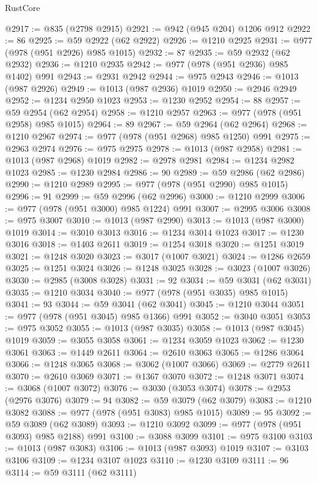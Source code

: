 \begin{lexlean}{RustCore}
\begin{coremodule}
@2917 := @835 (@2798 @2915)
@2921 := @942 (@945 @204) @1206 @912
@2922 := 86
@2925 := @59 @2922 (@62 @2922)
@2926 := @1210 @2925
@2931 := @977 (@978 (@951 @2926) @985 @1015)
@2932 := 87
@2935 := @59 @2932 (@62 @2932)
@2936 := @1210 @2935
@2942 := @977 (@978 (@951 @2936) @985 @1402) @991
@2943 := @2931 @2942
@2944 := @975 @2943
@2946 := @1013 (@987 @2926)
@2949 := @1013 (@987 @2936) @1019
@2950 := @2946 @2949
@2952 := @1234 @2950 @1023
@2953 := @1230 @2952
@2954 := 88
@2957 := @59 @2954 (@62 @2954)
@2958 := @1210 @2957
@2963 := @977 (@978 (@951 @2958) @985 @1015)
@2964 := 89
@2967 := @59 @2964 (@62 @2964)
@2968 := @1210 @2967
@2974 := @977 (@978 (@951 @2968) @985 @1250) @991
@2975 := @2963 @2974
@2976 := @975 @2975
@2978 := @1013 (@987 @2958)
@2981 := @1013 (@987 @2968) @1019
@2982 := @2978 @2981
@2984 := @1234 @2982 @1023
@2985 := @1230 @2984
@2986 := 90
@2989 := @59 @2986 (@62 @2986)
@2990 := @1210 @2989
@2995 := @977 (@978 (@951 @2990) @985 @1015)
@2996 := 91
@2999 := @59 @2996 (@62 @2996)
@3000 := @1210 @2999
@3006 := @977 (@978 (@951 @3000) @985 @1224) @991
@3007 := @2995 @3006
@3008 := @975 @3007
@3010 := @1013 (@987 @2990)
@3013 := @1013 (@987 @3000) @1019
@3014 := @3010 @3013
@3016 := @1234 @3014 @1023
@3017 := @1230 @3016
@3018 := @1403 @2611
@3019 := @1254 @3018
@3020 := @1251 @3019
@3021 := @1248 @3020
@3023 := @3017 (@1007 @3021)
@3024 := @1286 @2659
@3025 := @1251 @3024
@3026 := @1248 @3025
@3028 := @3023 (@1007 @3026)
@3030 := @2985 (@3008 @3028)
@3031 := 92
@3034 := @59 @3031 (@62 @3031)
@3035 := @1210 @3034
@3040 := @977 (@978 (@951 @3035) @985 @1015)
@3041 := 93
@3044 := @59 @3041 (@62 @3041)
@3045 := @1210 @3044
@3051 := @977 (@978 (@951 @3045) @985 @1366) @991
@3052 := @3040 @3051
@3053 := @975 @3052
@3055 := @1013 (@987 @3035)
@3058 := @1013 (@987 @3045) @1019
@3059 := @3055 @3058
@3061 := @1234 @3059 @1023
@3062 := @1230 @3061
@3063 := @1449 @2611
@3064 := @2610 @3063
@3065 := @1286 @3064
@3066 := @1248 @3065
@3068 := @3062 (@1007 @3066)
@3069 := @2779 @2611
@3070 := @2610 @3069
@3071 := @1367 @3070
@3072 := @1248 @3071
@3074 := @3068 (@1007 @3072)
@3076 := @3030 (@3053 @3074)
@3078 := @2953 (@2976 @3076)
@3079 := 94
@3082 := @59 @3079 (@62 @3079)
@3083 := @1210 @3082
@3088 := @977 (@978 (@951 @3083) @985 @1015)
@3089 := 95
@3092 := @59 @3089 (@62 @3089)
@3093 := @1210 @3092
@3099 := @977 (@978 (@951 @3093) @985 @2188) @991
@3100 := @3088 @3099
@3101 := @975 @3100
@3103 := @1013 (@987 @3083)
@3106 := @1013 (@987 @3093) @1019
@3107 := @3103 @3106
@3109 := @1234 @3107 @1023
@3110 := @1230 @3109
@3111 := 96
@3114 := @59 @3111 (@62 @3111)

\end{coremodule}
\end{lexlean}
